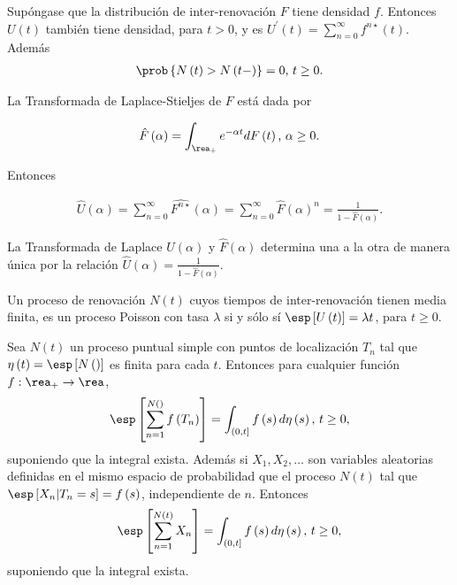 \begin{Prop}
Sup\'ongase que la distribuci\'on de inter-renovaci\'on $F$ tiene densidad $f$. Entonces $U\left(t\right)$ tambi\'en tiene densidad, para $t>0$, y es $U^{'}\left(t\right)=\sum_{n=0}^{\infty}f^{n\star}\left(t\right)$. Adem\'as
\begin{eqnarray*}
\prob\left\{N\left(t\right)>N\left(t-\right)\right\}=0\textrm{,   }t\geq0.
\end{eqnarray*}
\end{Prop}

\begin{Def}
La Transformada de Laplace-Stieljes de $F$ est\'a dada por

\begin{eqnarray*}
\hat{F}\left(\alpha\right)=\int_{\rea_{+}}e^{-\alpha t}dF\left(t\right)\textrm{,  }\alpha\geq0.
\end{eqnarray*}
\end{Def}

Entonces

\begin{eqnarray*}
\hat{U}\left(\alpha\right)=\sum_{n=0}^{\infty}\hat{F^{n\star}}\left(\alpha\right)=\sum_{n=0}^{\infty}\hat{F}\left(\alpha\right)^{n}=\frac{1}{1-\hat{F}\left(\alpha\right)}.
\end{eqnarray*}


\begin{Prop}
La Transformada de Laplace $\hat{U}\left(\alpha\right)$ y $\hat{F}\left(\alpha\right)$ determina una a la otra de manera \'unica por la relaci\'on $\hat{U}\left(\alpha\right)=\frac{1}{1-\hat{F}\left(\alpha\right)}$.
\end{Prop}


\begin{Note}
Un proceso de renovaci\'on $N\left(t\right)$ cuyos tiempos de inter-renovaci\'on tienen media finita, es un proceso Poisson con tasa $\lambda$ si y s\'olo s\'i $\esp\left[U\left(t\right)\right]=\lambda t$, para $t\geq0$.
\end{Note}


\begin{Teo}
Sea $N\left(t\right)$ un proceso puntual simple con puntos de localizaci\'on $T_{n}$ tal que $\eta\left(t\right)=\esp\left[N\left(\right)\right]$ es finita para cada $t$. Entonces para cualquier funci\'on $f:\rea_{+}\rightarrow\rea$,
\begin{eqnarray*}
\esp\left[\sum_{n=1}^{N\left(\right)}f\left(T_{n}\right)\right]=\int_{\left(0,t\right]}f\left(s\right)d\eta\left(s\right)\textrm{,  }t\geq0,
\end{eqnarray*}
suponiendo que la integral exista. Adem\'as si $X_{1},X_{2},\ldots$ son variables aleatorias definidas en el mismo espacio de probabilidad que el proceso $N\left(t\right)$ tal que $\esp\left[X_{n}|T_{n}=s\right]=f\left(s\right)$, independiente de $n$. Entonces
\begin{eqnarray*}
\esp\left[\sum_{n=1}^{N\left(t\right)}X_{n}\right]=\int_{\left(0,t\right]}f\left(s\right)d\eta\left(s\right)\textrm{,  }t\geq0,
\end{eqnarray*} 
suponiendo que la integral exista. 
\end{Teo}

